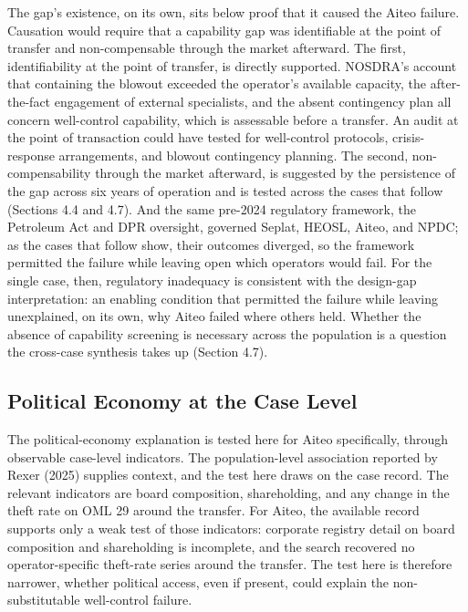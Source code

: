 The gap's existence, on its own, sits below proof that it caused the
Aiteo failure. Causation would require that a capability gap was
identifiable at the point of transfer and non-compensable through the
market afterward. The first, identifiability at the point of transfer,
is directly supported. NOSDRA's account that containing the blowout
exceeded the operator's available capacity, the after-the-fact
engagement of external specialists, and the absent contingency plan all
concern well-control capability, which is assessable before a transfer.
An audit at the point of transaction could have tested for well-control
protocols, crisis-response arrangements, and blowout contingency
planning. The second, non-compensability through the market afterward,
is suggested by the persistence of the gap across six years of operation
and is tested across the cases that follow (Sections 4.4 and 4.7). And
the same pre-2024 regulatory framework, the Petroleum Act and DPR
oversight, governed Seplat, HEOSL, Aiteo, and NPDC; as the cases that
follow show, their outcomes diverged, so the framework permitted the
failure while leaving open which operators would fail. For the single
case, then, regulatory inadequacy is consistent with the design-gap
interpretation: an enabling condition that permitted the failure while
leaving unexplained, on its own, why Aiteo failed where others held.
Whether the absence of capability screening is necessary across the
population is a question the cross-case synthesis takes up (Section
4.7).

\hypertarget{political-economy-at-the-case-level}{%
\subsection{Political Economy at the Case
Level}\label{political-economy-at-the-case-level}}

The political-economy explanation is tested here for Aiteo specifically,
through observable case-level indicators. The population-level
association reported by Rexer (2025) supplies context, and the test here
draws on the case record. The relevant indicators are board composition,
shareholding, and any change in the theft rate on OML 29 around the
transfer. For Aiteo, the available record supports only a weak test of
those indicators: corporate registry detail on board composition and
shareholding is incomplete, and the search recovered no
operator-specific theft-rate series around the transfer. The test here
is therefore narrower, whether political access, even if present, could
explain the non-substitutable well-control failure.

